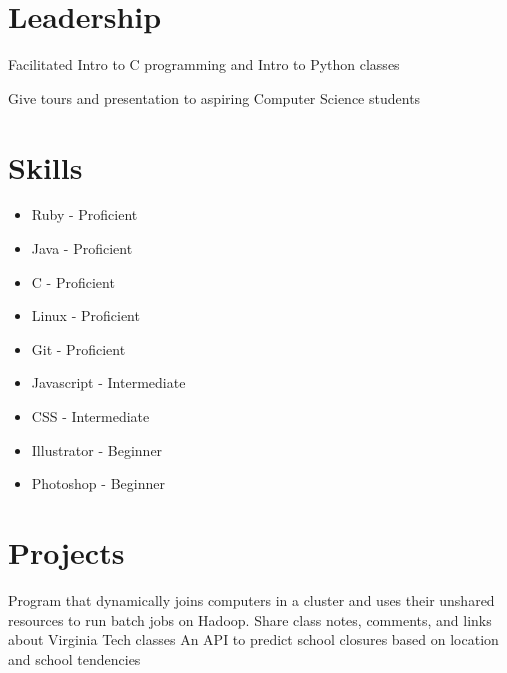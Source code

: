 \documentclass{my_cv}
\begin{document}
\section{Leadership}



\workitemsone
 {Facilitated Intro to C programming and Intro to Python classes}

\workitemsone
 {Give tours and presentation to aspiring Computer Science students}

\section{Skills}
\begin{multicols}{3}
\begin{itemize}
    \item Ruby - Proficient
    \item Java - Proficient
    \item C - Proficient
    \item Linux - Proficient
    \item Git - Proficient
    \item Javascript - Intermediate
    \item CSS - Intermediate
    \item Illustrator - Beginner
    \item Photoshop - Beginner
    
\end{itemize}
\end{multicols}

\section{Projects}
\workitemsone
 { Program that dynamically joins computers in a cluster and uses their unshared resources to run batch jobs on Hadoop.}
\workitemsone
 { Share class notes, comments, and links about  Virginia Tech classes }
\workitemsone
 { An API to predict school closures based on location and school tendencies }
\end{document}
